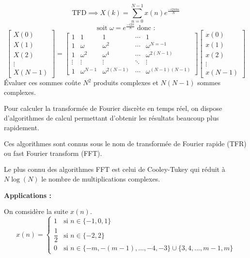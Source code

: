 \documentclass[a4paper,12pt]{article}
\begin{document}
\begin{defi}
    \[ \mathrm{TFD} \implies X(k) = \sum_{n=0}^{N-1} x(n) e^{\frac{-i2\pi kn}{N}} \]
    \[ \text{soit } \omega = e^{\frac{-i2\pi}{N}} \text{ donc :} \]
    \[ \begin{bmatrix}
        X(0) \\
        X(1) \\
        X(2) \\
        \vdots \\
        X(N-1)
    \end{bmatrix}
    = \begin{bmatrix}
        1 & 1 & 1 & \cdots & 1 \\
        1 & \omega & \omega^2 & \cdots & \omega^{N=-1} \\
        1 & \omega^2 & \omega^4 & \cdots & \omega^{2(N-1)} \\
        \vdots & \vdots & \vdots & \ddots & \vdots \\
        1 & \omega^{N-1} & \omega^{2(N-1)} & \cdots & \omega^{(N-1)(N-1)}
    \end{bmatrix} \begin{bmatrix}
        x(0) \\
        x(1) \\
        x(2) \\
        \vdots \\
        x(N-1)
    \end{bmatrix} \]
    Évaluer ces sommes coûte $N^2$ produits complexes et $N(N-1)$ sommes complexes.

    Pour calculer la transformée de Fourier discrète en temps réel, on dispose d'algorithmes de calcul permettant d'obtenir les résultats beaucoup plus rapidement.

    Ces algorithmes sont connus sous le nom de transformée de Fourier rapide (TFR) ou fast Fourier transform (FFT).

    Le plus connu des algorithmes FFT est celui de Cooley-Tukey qui réduit à $N \log(N)$ le nombre de multiplications complexes.
\end{defi}

\textbf{Applications :}

On comsidère la suite $x(n)$.
\[ x(n) = \begin{cases}
    1 & \text{si } n \in \{ -1, 0, 1 \} \\
    \dfrac{1}{2} & \text{si } n \in \{ -2, 2 \} \\
    0 & \text{si } n \in \{ -m, -(m-1), ..., -4, -3 \} \cup \{ 3, 4, ..., m-1, m \}
\end{cases} \]
\end{document}
